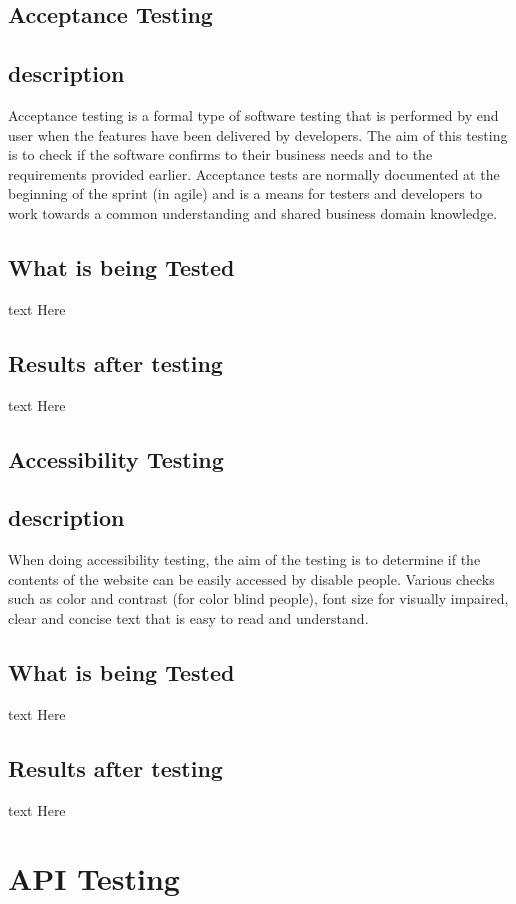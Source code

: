 \documentclass[12pt]{article}
\begin{document}
	\subsection{Acceptance Testing}
		\subsection{description}
		Acceptance testing is a formal type of software testing that is performed by end user when the features have been 			delivered by developers. The aim of this testing is to check if the software confirms to their business needs and to the 		 requirements provided earlier. Acceptance tests are normally documented at the beginning of the sprint (in agile) and is 		  a means for testers and developers to work towards a common understanding and shared business domain knowledge.
		\subsection{What is being Tested}
		text Here
		\subsection{Results after testing}
		text Here
		
	\subsection{Accessibility Testing}
		\subsection{description}
		When doing accessibility testing, the aim of the testing is to determine if the contents of the website can be easily 			accessed by disable people. Various checks such as color and contrast (for color blind people), font size for visually 			impaired, clear and concise text that is easy to read and understand.
		
		\subsection{What is being Tested}
		text Here
		\subsection{Results after testing}
		text Here
	
	

\section{API Testing}
\end{document}
